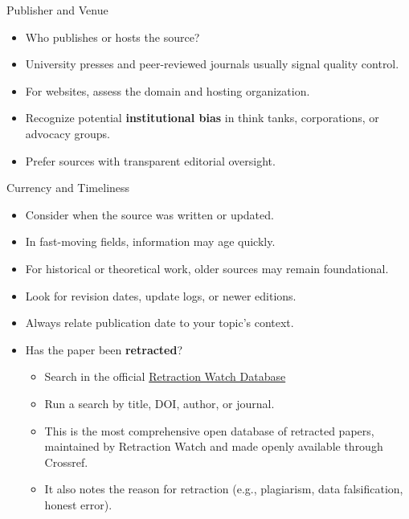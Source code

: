 \documentclass[aspectratio=169]{beamer}
\begin{document}
\begin{frame}{Publisher and Venue}
\begin{itemize}
  \item Who publishes or hosts the source?
  \item University presses and peer-reviewed journals usually signal quality control.
  \item For websites, assess the domain and hosting organization.
  \item Recognize potential \textbf{institutional bias} in think tanks, corporations, or advocacy groups.
  \item Prefer sources with transparent editorial oversight.
\end{itemize}
\end{frame}

\begin{frame}{Currency and Timeliness}
\begin{itemize}
  \item Consider when the source was written or updated.
  \item In fast-moving fields, information may age quickly.
  \item For historical or theoretical work, older sources may remain foundational.
  \item Look for revision dates, update logs, or newer editions.
  \item Always relate publication date to your topic’s context.
  \item Has the paper been \textbf{retracted}?
    \begin{itemize}
    \item Search in the official \href{https://retractiondatabase.org}{Retraction Watch Database}
    \item Run a search by title, DOI, author, or journal.
    \item This is the most comprehensive open database of retracted papers, maintained by Retraction Watch and made openly available through Crossref.
    \item It also notes the reason for retraction (e.g., plagiarism, data falsification, honest error).
    \end{itemize}
\end{itemize}
\end{frame}
\end{document}
